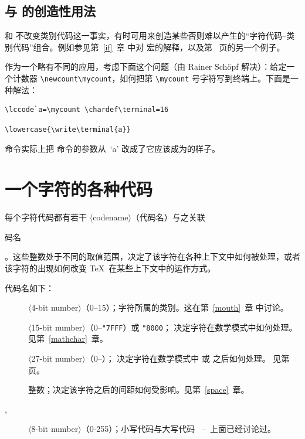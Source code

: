 \documentclass[a4paper]{rapport3}
\def\gr#1{$\langle$#1$\rangle$}\def\key#1{{\tt#1}}
\def\rdash{\unskip\nobreak\ --\ \ignorespaces}
\def\hex{{\tt"}}
\def\term#1\par{\index{#1}}
\begin{document}
\subsection{ 与  的创造性用法}

 和  不改变类别代码这一事实，有时可用来创造某些否则难以产生的“字符代码–类别代码”组合。例如参见第~\ref{if}~章 中对  宏的解释，以及第~\pageref{spsb:truc} 页的另一个例子。

作为一个略有不同的应用，考虑下面这个问题（由 Rainer Sch\"opf 解决）：给定一个计数器 \verb-\newcount\mycount-，如何把第 \verb-\mycount- 号字符写到终端上。下面是一种解法：
\begin{verbatim}
\lccode`a=\mycount \chardef\terminal=16
\end{verbatim}
\awp
\begin{verbatim}
\lowercase{\write\terminal{a}}
\end{verbatim}
 命令实际上把  命令的参数从~`\n a' 改成了它应该成为的样子。

\section{一个字符的各种代码}
\label{codename}

每个字符代码都有若干 \gr{codename}（代码名）与之关联
\term 代码名\par
。这些整数处于不同的取值范围，决定了该字符在各种上下文中如何被处理，或者该字符的出现如何改变 \TeX\ 在某些上下文中的运作方式。

代码名如下：
\begin{description}\item []
\gr{4-bit number}（0--15）；字符所属的类别。这在第~\ref{mouth}~章 中讨论。
\item []
\gr{15-bit number}（0--\verb-"7FFF-）或 \verb-"8000-；
决定字符在数学模式中如何处理。见第~\ref{mathchar}~章。
\item []
\gr{27-bit number}（0--\n{\hex7$\,$FFF$\,$FFF}）；
决定字符在数学模式中  或  之后如何处理。
见第~\pageref{delcodes} 页。
\item []
整数；决定该字符之后的间距如何受影响。见第~\ref{space}~章。
\item [, ]
\gr{8-bit number}（0-255）；小写代码与大写代码 \rdash 上面已经讨论过。
\end{description}
\end{document}
